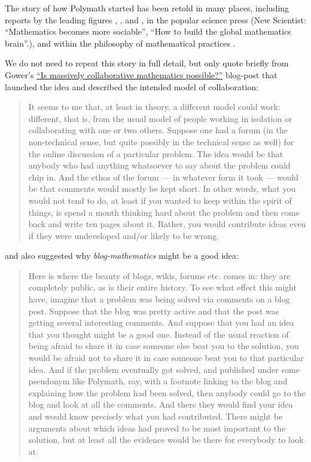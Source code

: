 \documentclass[article, floatfix, groupaddress, prb]{revtex4-1}
\begin{document}
The story of how Polymath started has been retold in many places,
including reports by the leading figures \cite{Gowers:Nature:2009},
\cite{Gowers:AnIrregularMind:2010}, and
\cite{Nielsen:ReinventingDiscoveryTheNewEraOf:2012}, in the popular
science press (New Scientist: ``Mathematics becomes more sociable'',
``How to build the global mathematics brain''.), and within the
philosophy of mathematical practices
\cite{VanBendegem:MathematicsAndTheNewTechnologiesPartIii:}.

We do not need to repeat this story in full detail, but only quote
briefly from Gower's
\href{https://gowers.wordpress.com/2009/01/27/is-massively-collaborative-mathematics-possible/}{``Is
massively collaborative mathematics possible?''} blog-post that launched
the idea and described the intended model of collaboration:

\begin{quote}
It seems to me that, at least in theory, a different model could work:
different, that is, from the usual model of people working in isolation
or collaborating with one or two others. Suppose one had a forum (in the
non-technical sense, but quite possibly in the technical sense as well)
for the online discussion of a particular problem. The idea would be
that anybody who had anything whatsoever to say about the problem could
chip in. And the ethos of the forum --- in whatever form it took ---
would be that comments would mostly be kept short. In other words, what
you would not tend to do, at least if you wanted to keep within the
spirit of things, is spend a month thinking hard about the problem and
then come back and write ten pages about it. Rather, you would
contribute ideas even if they were undeveloped and/or likely to be
wrong.
\end{quote}

and also suggested why \emph{blog-mathematics} might be a good idea:

\begin{quote}
Here is where the beauty of blogs, wikis, forums etc. comes in: they are
completely public, as is their entire history. To see what effect this
might have, imagine that a problem was being solved via comments on a
blog post. Suppose that the blog was pretty active and that the post was
getting several interesting comments. And suppose that you had an idea
that you thought might be a good one. Instead of the usual reaction of
being afraid to share it in case someone else beat you to the solution,
you would be afraid not to share it in case someone beat you to that
particular idea. And if the problem eventually got solved, and published
under some pseudonym like Polymath, say, with a footnote linking to the
blog and explaining how the problem had been solved, then anybody could
go to the blog and look at all the comments. And there they would find
your idea and would know precisely what you had contributed. There might
be arguments about which ideas had proved to be most important to the
solution, but at least all the evidence would be there for everybody to
look at.
\end{quote}
\end{document}
